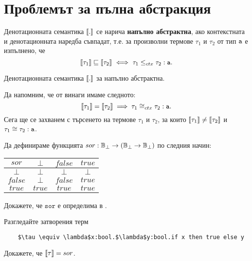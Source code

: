 \section{Проблемът за пълна абстракция}\label{pcf:sect:full-abstraction}
\begin{definition}
  Денотационната семантика $\llbracket{.}\rrbracket$ се нарича {\bf напълно абстрактна}, ако
  контекстната и денотационната наредба съвпадат, т.е.
  за произволни термове $\tau_1$ и $\tau_2$ от тип $\texttt{a}$ е изпълнено, че
  \[\llbracket{\tau_1}\rrbracket \sqsubseteq \llbracket{\tau_2}\rrbracket \ \Longleftrightarrow\  \tau_1 \leq_{ctx} \tau_2 : \texttt{a}.\]
\end{definition}

\begin{framed}
  \begin{theorem}
    Денотационната семантика $\llbracket{.}\rrbracket$ за  напълно абстрактна.
  \end{theorem}
\end{framed}
Да напомним, че от  винаги имаме следното:
\[ \llbracket{\tau_1}\rrbracket = \llbracket{\tau_2}\rrbracket \implies \tau_1 \cong_{ctx} \tau_2 : \texttt{a}.\]
Сега ще се захванем с търсенето на термове $\tau_1$ и $\tau_2$, за които
$\llbracket{\tau_1}\rrbracket \neq \llbracket{\tau_2}\rrbracket$ и $\tau_1 \cong \tau_2 : \texttt{a}$.

\begin{problem}
  Да дефинираме функцията $sor:\mathbb{B}_\bot \to (\mathbb{B}_\bot \to \mathbb{B}_\bot)$ по следния начин:

  \vspace{10pt}
  
  \begin{tabular}{|c|c|c|c|}
    \hline
    $sor$ & $\bot$ & $false$ & $true$ \\
    \hline
    $\bot$ & $\bot$ & $\bot$ & $\bot$\\
    \hline
    $false$ & $\bot$ & $false$ & $true$\\
    \hline
    $true$ & $true$ & $true$ & $true$\\
    \hline
  \end{tabular}

  \vspace{10pt}
  
  Докажете, че $\texttt{sor}$ е определима в \PCFBOOL.
\end{problem}
\begin{hint}
  Разгледайте затворения терм
  \begin{lstlisting}
    $\tau \equiv \lambda$x:bool.$\lambda$y:bool.if x then true else y
  \end{lstlisting}
  Докажете, че $\llbracket{\tau}\rrbracket = sor$.
\end{hint}

